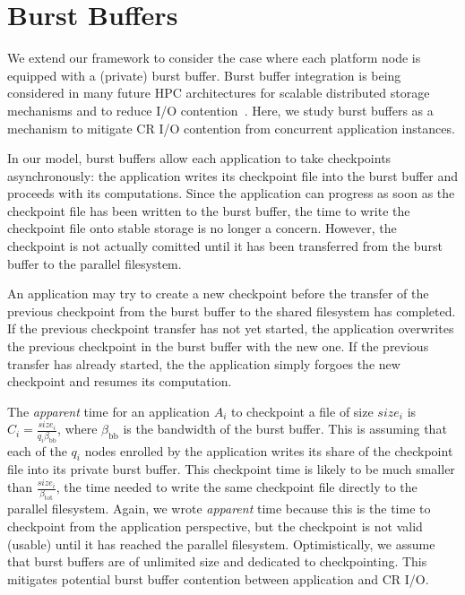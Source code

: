 \documentclass[two]{article}
\newcommand{\bandtotal}{\beta_{\text{tot}}}
\newcommand{\app}[1]{A_{#1}}
\newcommand{\nbnodes}[1]{q_{#1}}
\newcommand{\ckpt}[1]{C_{#1}}
\newcommand{\size}[1]{\mathit{size}_{#1}}
\newcommand{\bwbb}{\beta_{\text{bb}}}
\begin{document}
\section{Burst Buffers}
\label{sec:burstbuffers}

We extend our framework to consider the case where each platform node is equipped
with a (private) burst buffer.  Burst buffer integration is being considered in many
future HPC architectures for scalable distributed storage mechanisms and to reduce
I/O contention~\cite{amm2014,ammecp2018}.  Here, we study burst buffers as a
mechanism to mitigate CR I/O contention from concurrent application instances.

In our model, burst buffers allow each application to take checkpoints
asynchronously: the application writes its checkpoint file into the burst buffer and
proceeds with its computations. Since the application can progress as soon as the
checkpoint file has been written to the burst buffer, the time to write the
checkpoint file onto stable storage is no longer a concern.  However, the checkpoint
is not actually comitted until it has been transferred from the burst buffer to the
parallel filesystem.

An application may try to create a new checkpoint before the transfer of the previous
checkpoint from the burst buffer to the shared filesystem has completed. If the
previous checkpoint transfer has not yet started, the application overwrites the
previous checkpoint in the burst buffer with the new one. If the previous transfer
has already started, the the application simply forgoes the new checkpoint and
resumes its computation.
 
The \emph{apparent} time for an application $\app{i}$ to checkpoint a file of size
$\size{i}$ is $\ckpt{i} = \frac{\size{i}}{\nbnodes{i} \bwbb}$, where $\bwbb$ is the
bandwidth of the burst buffer. This is assuming that each of the $\nbnodes{i}$ nodes
enrolled by the application writes its share of the checkpoint file into its private
burst buffer. This checkpoint time is likely to be much smaller than
$\frac{\size{i}}{\bandtotal}$, the time needed to write the same checkpoint file
directly to the parallel filesystem.  Again, we wrote \emph{apparent} time because
this is the time to checkpoint from the application perspective, but the checkpoint
is not valid (usable) until it has reached the parallel filesystem.
Optimistically, we assume that burst buffers are of unlimited size and dedicated to
checkpointing. This mitigates potential burst buffer contention between application
and CR I/O.
 
\end{document}

